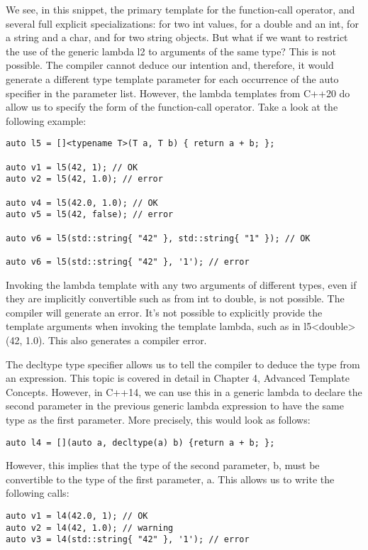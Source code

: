 We see, in this snippet, the primary template for the function-call operator, and several full explicit specializations: for two int values, for a double and an int, for a string and a char, and for two string objects. But what if we want to restrict the use of the generic lambda l2 to arguments of the same type? This is not possible. The compiler cannot deduce our intention and, therefore, it would generate a different type template parameter for each occurrence of the auto specifier in the parameter list. However, the lambda templates from C++20 do allow us to specify the form of the function-call operator. Take a look at the following example:

\begin{lstlisting}[style=styleCXX]
auto l5 = []<typename T>(T a, T b) { return a + b; };

auto v1 = l5(42, 1); // OK
auto v2 = l5(42, 1.0); // error

auto v4 = l5(42.0, 1.0); // OK
auto v5 = l5(42, false); // error

auto v6 = l5(std::string{ "42" }, std::string{ "1" }); // OK

auto v6 = l5(std::string{ "42" }, '1'); // error
\end{lstlisting}

Invoking the lambda template with any two arguments of different types, even if they are implicitly convertible such as from int to double, is not possible. The compiler will generate an error. It's not possible to explicitly provide the template arguments when invoking the template lambda, such as in l5<double>(42, 1.0). This also generates a compiler error.

The decltype type specifier allows us to tell the compiler to deduce the type from an expression. This topic is covered in detail in Chapter 4, Advanced Template Concepts. However, in C++14, we can use this in a generic lambda to declare the second parameter in the previous generic lambda expression to have the same type as the first parameter. More precisely, this would look as follows:

\begin{lstlisting}[style=styleCXX]
auto l4 = [](auto a, decltype(a) b) {return a + b; };
\end{lstlisting}

However, this implies that the type of the second parameter, b, must be convertible to the type of the first parameter, a. This allows us to write the following calls:

\begin{lstlisting}[style=styleCXX]
auto v1 = l4(42.0, 1); // OK
auto v2 = l4(42, 1.0); // warning
auto v3 = l4(std::string{ "42" }, '1'); // error
\end{lstlisting}

